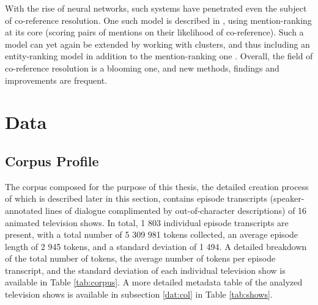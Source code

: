 \documentclass[a4paper, 11pt]{article}
\begin{document}
With the rise of neural networks, such systems have penetrated even the subject of co-reference resolution. One such model is described in \citet{clark2016deep}, using mention-ranking at its core (scoring pairs of mentions on their likelihood of co-reference). Such a model can yet again be extended by working with clusters, and thus including an entity-ranking model in addition to the mention-ranking one \citep{clark2016impr}. Overall, the field of co-reference resolution is a blooming one, and new methods, findings and improvements are frequent.

\section{Data}

\subsection{Corpus Profile}
The corpus composed for the purpose of this thesis, the detailed creation process of which is described later in this section, contains episode transcripts (speaker-annotated lines of dialogue complimented by out-of-character descriptions) of 16 animated television shows\footnotemark. In total, 1 803 individual episode transcripts are present, with a total number of 5 309 981 tokens collected, an average episode length of 2 945 tokens, and a standard deviation of 1 494. A detailed breakdown of the total number of tokens, the average number of tokens per episode transcript, and the standard deviation of each individual television show is available in Table \ref{tab:corpus}. A more detailed metadata table of the analyzed television shows is available in subsection \ref{dat:col} in Table \ref{tab:shows}.

\end{document}
